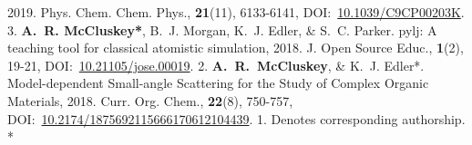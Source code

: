 \begin{cvpubys}
    {2019.}
    {Phys. Chem. Chem. Phys.,}
    {\textbf{21}(11), 6133-6141,}
    {DOI:~\href{https://doi.org/10.1039/C9CP00203K}{10.1039/C9CP00203K}.}
    {3.}
  \cvpuby
    {\textbf{A.~R. McCluskey*}, B.~J. Morgan, K.~J. Edler, \& S.~C. Parker.}
    {pylj: A teaching tool for classical atomistic simulation,}
    {2018.}
    {J. Open Source Educ.,}
    {\textbf{1}(2), 19-21,}
    {DOI:~\href{http://doi.org/10.21105/jose.00019}{10.21105/jose.00019}.}
    {2.}
  \cvpuby
    {\textbf{A.~R.~McCluskey}, \& K.~J. Edler*.}
    {Model-dependent Small-angle Scattering for the Study of Complex Organic Materials,}
    {2018.}
    {Curr. Org. Chem.,}
    {\textbf{22}(8), 750-757,}
    {DOI:~\href{http://doi.org/10.2174/1875692115666170612104439}{10.2174/1875692115666170612104439}.}
    {1.}
  \cvpuby
    {Denotes corresponding authorship.}
    {}
    {}
    {}
    {}
    {}
    {*}
\end{cvpubys}

